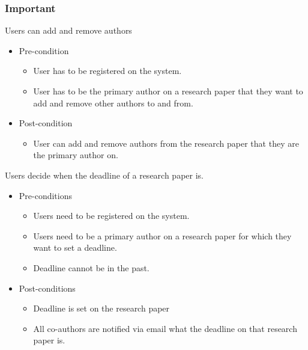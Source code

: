 \documentclass[a4paper,12pt]{report}
\begin{document}
\subsubsection{Important}
	Users can add and remove authors
	\begin{itemize}
		\item Pre-condition
			\begin{itemize}
				\item User has to be registered on the system.
				\item User has to be the primary author on a research paper that they want to add and remove other authors to and from.
			\end{itemize}
		\item Post-condition
			\begin{itemize}
				\item User can add and remove authors from the research paper that they are the primary author on.
			\end{itemize}
	\end{itemize}

	Users decide when the deadline of a research paper is.
	\begin{itemize}
		\item Pre-conditions
			\begin{itemize}
				\item Users need to be registered on the system.
				\item Users need to be a primary author on a research paper for which they want to set a deadline.
				\item Deadline cannot be in the past.
			\end{itemize}
		\item Post-conditions
			\begin{itemize}
				\item Deadline is set on the research paper
				\item All co-authors are notified via email what the deadline on that research paper is.
			\end{itemize}
	\end{itemize}
\end{document}
